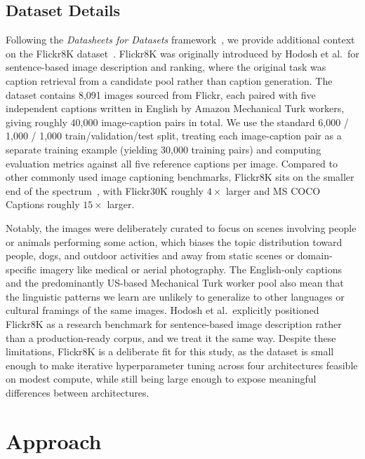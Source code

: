 \documentclass[10pt,twocolumn,letterpaper]{article}
\begin{document}
\subsection{Dataset Details}
Following the \emph{Datasheets for Datasets}
framework~\cite{gebru2018datasheets}, we provide additional context
on the Flickr8K dataset~\cite{hodosh2013framing}. Flickr8K was 
originally introduced by Hodosh et al.\ for
sentence-based image description and ranking, where the original
task was caption retrieval from a candidate pool rather than caption
generation. The dataset contains 8,091 images sourced from Flickr,
each paired with five independent captions written in English by
Amazon Mechanical Turk workers, giving roughly 40,000 image-caption
pairs in total. We use the standard 6,000 / 1,000 / 1,000
train/validation/test split, treating each image-caption pair as a
separate training example (yielding 30,000 training pairs) and
computing evaluation metrics against all five reference captions
per image. Compared to other commonly used image captioning
benchmarks, Flickr8K sits on the smaller end of the
spectrum~\cite{hossain2019survey}, with Flickr30K roughly $4\times$
larger and MS COCO Captions roughly $15\times$ larger.

Notably, the images were deliberately curated to focus on scenes
involving people or animals performing some action, which biases
the topic distribution toward people, dogs, and outdoor activities
and away from static scenes or domain-specific imagery like medical
or aerial photography. The English-only captions and the
predominantly US-based Mechanical Turk worker pool also mean that
the linguistic patterns we learn are unlikely to generalize to
other languages or cultural framings of the same images. Hodosh et
al.\ explicitly positioned Flickr8K as a research benchmark for
sentence-based image description rather than a production-ready
corpus, and we treat it the same way. 
Despite
these limitations, Flickr8K is a deliberate fit for this study, as
the dataset is small enough to make iterative hyperparameter tuning
across four architectures feasible on modest compute, while still
being large enough to expose meaningful differences between
architectures.

\section{Approach}
\end{document}
